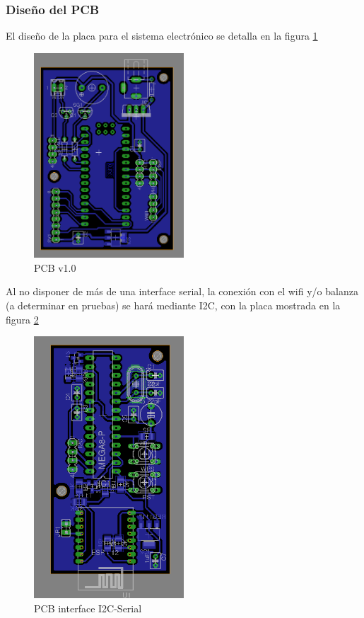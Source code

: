 \subsubsection{Dise\~no del PCB}
El dise\~no de la placa para el sistema electr\'onico se detalla en la figura \ref{fig:pcb}
\begin{figure}[h!]
	\begin{center}
		\includegraphics[width=0.5\textwidth]{images/weightlogger_pcb.png}
		\caption{PCB v1.0}
		\label{fig:pcb}
	\end{center}
\end{figure}

Al no disponer de más de una interface serial, la conexión con el wifi y/o balanza (a determinar en pruebas) 
se hará mediante I2C, con la placa mostrada en la figura \ref{fig:pcb-i2c}
\begin{figure}[h!]
	\begin{center}
		\includegraphics[width=0.5\textwidth]{images/interface-i2c-wifi.png}
		\caption{PCB interface I2C-Serial}
		\label{fig:pcb-i2c}
	\end{center}
\end{figure}

